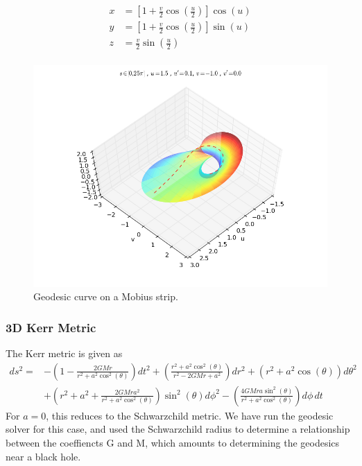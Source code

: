 \documentclass[main.tex]{subfiles}
\begin{document}
\begin{align*}
	x &= \left[1 + \frac{v}{2}\cos\left(\frac{u}{2}\right)\right]\cos\left(u\right)\\
    y &= \left[1 + \frac{v}{2}\cos\left(\frac{u}{2}\right)\right]\sin\left(u\right)\\
    z &= \frac{v}{2}\sin\left(\frac{u}{2}\right)\\
\end{align*}

\begin{figure}[H]
\centering
\includegraphics[scale=0.45,natwidth=812,natheight=612]
{../figures/geodesic_curve_on_mobius_strip.png}
\caption[Geodesic curve on a Mobius strip.]{Geodesic curve on a Mobius strip.}
\end{figure}

\subsubsection{3D Kerr Metric}

The Kerr metric is given as
\begin{align*}
ds^2 = &-\left(1 - \frac{2GMr}{r^2+a^2\cos^2(\theta)}\right) dt^2 +
	      \left(\frac{r^2+a^2\cos^2(\theta)}{r^2-2GMr+a^2}\right) dr^2 +
		  \left(r^2+a^2\cos(\theta)\right) d\theta^2\\ 
		&+
		  \left(r^2+a^2+\frac{2GMra^2}{r^2+a^2\cos^2(\theta)}\right)\sin^2(\theta) d\phi^2 -
		  \left(\frac{4GMra\sin^2(\theta)}{r^2+a^2\cos^2(\theta)}\right) d\phi\, dt
\end{align*}
For $a = 0$, this reduces to the Schwarzchild metric. We have run the geodesic solver
for this case, and used the Schwarzchild radius to determine a relationship between 
the coeffiencts G and M, which amounts to determining the geodesics near a black hole.
\end{document}
